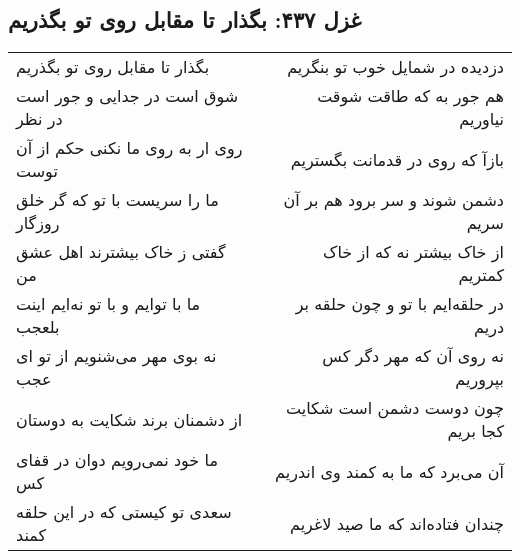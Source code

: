 \begin{center}
\section*{غزل ۴۳۷: بگذار تا مقابل روی تو بگذریم}
\label{sec:437}
\begin{longtable}{l p{0.5cm} r}
بگذار تا مقابل روی تو بگذریم
&&
دزدیده در شمایل خوب تو بنگریم
\\
شوق است در جدایی و جور است در نظر
&&
هم جور به که طاقت شوقت نیاوریم
\\
روی ار به روی ما نکنی حکم از آن توست
&&
بازآ که روی در قدمانت بگستریم
\\
ما را سریست با تو که گر خلق روزگار
&&
دشمن شوند و سر برود هم بر آن سریم
\\
گفتی ز خاک بیشترند اهل عشق من
&&
از خاک بیشتر نه که از خاک کمتریم
\\
ما با توایم و با تو نه‌ایم اینت بلعجب
&&
در حلقه‌ایم با تو و چون حلقه بر دریم
\\
نه بوی مهر می‌شنویم از تو ای عجب
&&
نه روی آن که مهر دگر کس بپروریم
\\
از دشمنان برند شکایت به دوستان
&&
چون دوست دشمن است شکایت کجا بریم
\\
ما خود نمی‌رویم دوان در قفای کس
&&
آن می‌برد که ما به کمند وی اندریم
\\
سعدی تو کیستی که در این حلقه کمند
&&
چندان فتاده‌اند که ما صید لاغریم
\\
\end{longtable}
\end{center}
